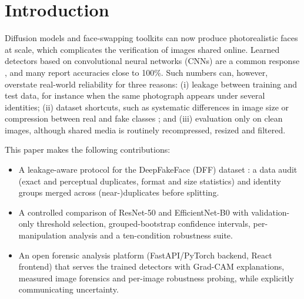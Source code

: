 \documentclass[conference]{IEEEtran}
\begin{document}
\section{Introduction}
Diffusion models and face-swapping toolkits can now produce photorealistic faces at scale, which complicates the verification of images shared online. Learned detectors based on convolutional neural networks (CNNs) are a common response \cite{wang2020cnn,rossler2019ff}, and many report accuracies close to 100\%. Such numbers can, however, overstate real-world reliability for three reasons: (i) leakage between training and test data, for instance when the same photograph appears under several identities; (ii) dataset shortcuts, such as systematic differences in image size or compression between real and fake classes \cite{grommelt2024fake}; and (iii) evaluation only on clean images, although shared media is routinely recompressed, resized and filtered.

This paper makes the following contributions:
\begin{itemize}
\item A leakage-aware protocol for the DeepFakeFace (DFF) dataset \cite{song2023dff}: a data audit (exact and perceptual duplicates, format and size statistics) and identity groups merged across (near-)duplicates before splitting.
\item A controlled comparison of ResNet-50 \cite{he2016resnet} and EfficientNet-B0 \cite{tan2019efficientnet} with validation-only threshold selection, grouped-bootstrap confidence intervals, per-manipulation analysis and a ten-condition robustness suite.
\item An open forensic analysis platform (FastAPI/PyTorch backend, React frontend) that serves the trained detectors with Grad-CAM \cite{selvaraju2017gradcam} explanations, measured image forensics and per-image robustness probing, while explicitly communicating uncertainty.
\end{itemize}
\end{document}
